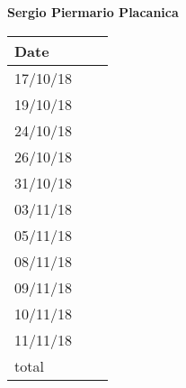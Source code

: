 \documentclass[../main.tex]{subfiles}
\begin{document}
\begin{center}
	{\bf Sergio Piermario Placanica}
	\vspace{2mm}

		\begin{tabular}{p{1.3cm}|p{1.8cm}|p{6.7cm}}
			\hline
			\bf Date & \bf \makebox[1.8cm][c]{Hours} & \bf \makebox[6.7cm][c]{Description} \\
			\hline
			17/10/18 & \makebox[1.8cm][c]{2h} & \makebox[6.7cm][c]{Introduction}\\
			19/10/18 & \makebox[1.8cm][c]{3h} & \makebox[6.7cm][c]{Goals, Requirements, Domain assumptions}\\
			24/10/18 & \makebox[1.8cm][c]{4h} & \makebox[6.7cm][c]{Goals, Requirements, Domain assumptions}\\
			26/10/18 & \makebox[1.8cm][c]{2h} & \makebox[6.7cm][c]{Purpose, Scope}\\
			31/10/18 & \makebox[1.8cm][c]{4h} & \makebox[6.7cm][c]{Mockups}\\
			03/11/18 & \makebox[1.8cm][c]{4h} & \makebox[6.7cm][c]{Mockups}\\
			05/11/18 & \makebox[1.8cm][c]{1h} & \makebox[6.7cm][c]{Scenarios, Sequence Diagram}\\
			08/11/18 & \makebox[1.8cm][c]{4h} & \makebox[6.7cm][c]{Mockups, Sequence Diagramm, Alloy}\\
			09/11/18 & \makebox[1.8cm][c]{4h} & \makebox[6.7cm][c]{Alloy, performance Requirements}\\
			10/11/18 & \makebox[1.8cm][c]{4h} & \makebox[6.7cm][c]{performance requirements, Revisioning}\\
			11/11/18 & \makebox[1.8cm][c]{4h} & \makebox[6.7cm][c]{Revisioning}\\
			total    & \makebox[1.8cm][c]{36h}
		\end{tabular}
\end{center}
\end{document}
